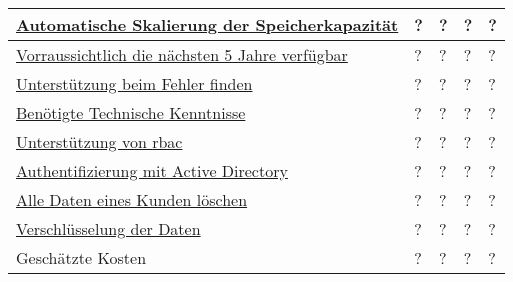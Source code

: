 \begin{xltabular}{\textwidth}{|p{.3\textwidth}|Y|Y|Y|Y|}
\hyperref[sec:anforderungsspezifikation:skalierungDerSpeicherkapazität]{Automatische Skalierung der Speicherkapazität}
& ? %
& ? %
& ? %
& ? %
\\ \hline

\hyperref[sec:anforderungsspezifikation:langlebigkeit]{Vorraussichtlich die nächsten 5 Jahre verfügbar}
& ? %
& ? %
& ? %
& ? %
\\ \hline

\hyperref[sec:anforderungsspezifikation:fehlerquellenIdentifizieren]{Unterstützung beim Fehler finden}
& ? %
& ? %
& ? %
& ? %
\\ \hline

\hyperref[sec:anforderungsspezifikation:einheitlicheTechnologie]{Benötigte Technische Kenntnisse}
& ? %
& ? %
& ? %
& ? %
\\ \hline

\hyperref[sec:anforderungsspezifikation:rbac]{Unterstützung von \ac{rbac}}
& ? %
& ? %
& ? %
& ? %
\\ \hline

\hyperref[sec:anforderungsspezifikation:SAG_AD]{Authentifizierung mit Active Directory}
& ? %
& ? %
& ? %
& ? %
\\ \hline

\hyperref[sec:anforderungsspezifikation:löschenKundendaten]{Alle Daten eines Kunden löschen}
& ? %
& ? %
& ? %
& ? %
\\ \hline

\hyperref[sec:anforderungsspezifikation:verschlüsselung]{Verschlüsselung der Daten}
& ? %
& ? %
& ? %
& ? %
\\ \hline

Geschätzte Kosten
& ? %
& ? %
& ? %
& ? %
\\ \hline

\end{xltabular}